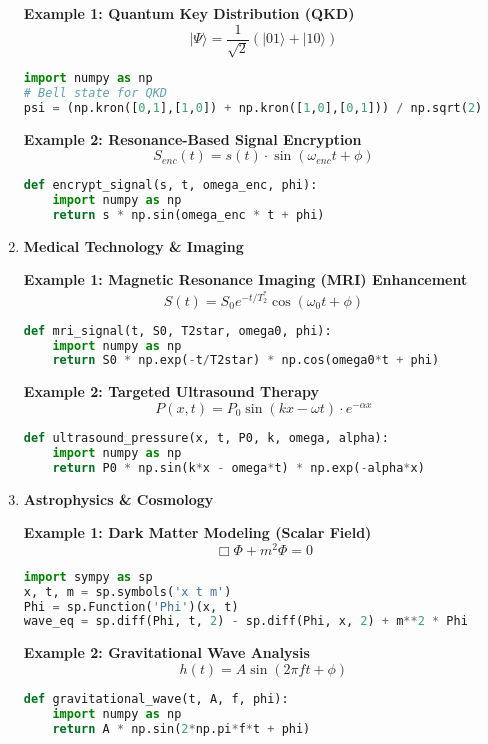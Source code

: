 \documentclass[12pt]{article}
\begin{document}
\begin{enumerate}[leftmargin=0pt, label=\textbf{\arabic*.}, itemsep=2em]
    \textbf{Example 1: Quantum Key Distribution (QKD)}
    \[
    |\Psi\rangle = \frac{1}{\sqrt{2}}(|01\rangle + |10\rangle)
    \]
    \begin{lstlisting}[language=Python]
import numpy as np
# Bell state for QKD
psi = (np.kron([0,1],[1,0]) + np.kron([1,0],[0,1])) / np.sqrt(2)
    \end{lstlisting}

    \textbf{Example 2: Resonance-Based Signal Encryption}
    \[
    S_{enc}(t) = s(t) \cdot \sin(\omega_{enc} t + \phi)
    \]
    \begin{lstlisting}[language=Python]
def encrypt_signal(s, t, omega_enc, phi):
    import numpy as np
    return s * np.sin(omega_enc * t + phi)
    \end{lstlisting}

\item \textbf{Medical Technology \& Imaging}

    \textbf{Example 1: Magnetic Resonance Imaging (MRI) Enhancement}
    \[
    S(t) = S_0 e^{-t/T_2^*} \cos(\omega_0 t + \phi)
    \]
    \begin{lstlisting}[language=Python]
def mri_signal(t, S0, T2star, omega0, phi):
    import numpy as np
    return S0 * np.exp(-t/T2star) * np.cos(omega0*t + phi)
    \end{lstlisting}

    \textbf{Example 2: Targeted Ultrasound Therapy}
    \[
    P(x, t) = P_0 \sin(kx - \omega t) \cdot e^{-\alpha x}
    \]
    \begin{lstlisting}[language=Python]
def ultrasound_pressure(x, t, P0, k, omega, alpha):
    import numpy as np
    return P0 * np.sin(k*x - omega*t) * np.exp(-alpha*x)
    \end{lstlisting}

\item \textbf{Astrophysics \& Cosmology}

    \textbf{Example 1: Dark Matter Modeling (Scalar Field)}
    \[
    \Box \Phi + m^2 \Phi = 0
    \]
    \begin{lstlisting}[language=Python]
import sympy as sp
x, t, m = sp.symbols('x t m')
Phi = sp.Function('Phi')(x, t)
wave_eq = sp.diff(Phi, t, 2) - sp.diff(Phi, x, 2) + m**2 * Phi
    \end{lstlisting}

    \textbf{Example 2: Gravitational Wave Analysis}
    \[
    h(t) = A \sin(2\pi f t + \phi)
    \]
    \begin{lstlisting}[language=Python]
def gravitational_wave(t, A, f, phi):
    import numpy as np
    return A * np.sin(2*np.pi*f*t + phi)
    \end{lstlisting}


\end{enumerate}
\end{document}
